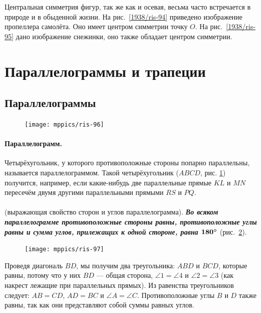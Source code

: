 \documentclass[oneside]{book}
\begin{document}
Центральная симметрия фигур, так же как и осевая, весьма часто встречается в природе и в обыденной жизни.
На рис.~\ref{1938/ris-94} приведено изображение пропеллера самолёта.
Оно имеет центром симметрии точку $O$.
На рис.~\ref{1938/ris-95} дано изображение снежинки, оно также обладает центром симметрии.


\section{Параллелограммы и трапеции}

\subsection*{Параллелограммы}

\begin{figure}
\vskip-5mm
\centering
\texttt{[image: mppics/ris-96]}
\caption{}\label{1938/ris-96}
\end{figure}

\paragraph{Параллелограмм.}\label{1938/87}
Четырёхугольник, у которого противоположные стороны попарно параллельны, называется параллелограммом.
Такой четырёхугольник ($ABCD$, рис. \ref{1938/ris-96}) получится, например, если какие-нибудь две параллельные прямые $KL$ и $MN$ пересечём двумя другими параллельными прямыми $RS$ и $PQ$.

\paragraph{}\label{1938/88}
\mbox{} (выражающая свойство сторон и углов параллелограмма).
\textbf{\emph{Во всяком параллелограмме противоположные стороны равны, противоположные углы равны и сумма углов, прилежащих к одной стороне, равна $\bm{180\degree}$}} (рис.~\ref{1938/ris-97}).

\begin{figure}
\centering
\texttt{[image: mppics/ris-97]}
\caption{}\label{1938/ris-97}
\end{figure}

Проведя диагональ $BD$, мы получим два треугольника:
$ABD$ и $BCD$, которые равны, потому что у них $BD$ — общая сторона, $\angle 1 = \angle 4$ и $\angle 2 = \angle 3$ (как накрест лежащие при параллельных прямых).
Из равенства треугольников следует:
$AB=CD$, $AD=BC$ и $\angle A = \angle C$.
Противоположные углы $B$ и $D$ также равны, так как они представляют собой суммы равных углов.
\end{document}
